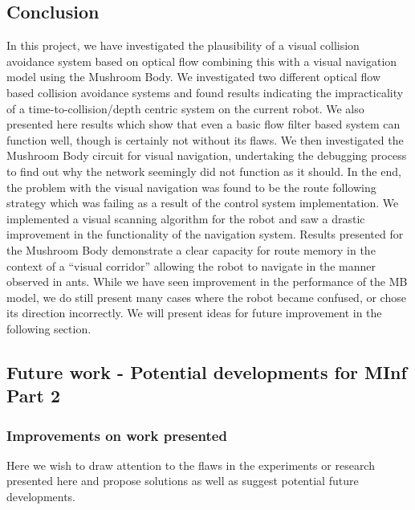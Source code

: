 \documentclass[a4paper,11pt,twoside,openright]{article}
\begin{document}
\subsection{Conclusion}
In this project, we have investigated the plausibility of a visual collision avoidance system based on optical flow combining
this with a visual navigation model using the Mushroom Body. We investigated two different optical flow based collision avoidance
systems and found results indicating the impracticality of a time-to-collision/depth centric system on the current robot. We
also presented here results which show that even a basic flow filter based system can function well, though is certainly
not without its flaws. We then investigated the Mushroom Body circuit for visual navigation, undertaking the debugging
process to find out why the network seemingly did not function as it should. In the end, the problem with the visual
navigation was found to be the route following strategy which was failing as a result of the control system implementation. We
implemented a visual scanning algorithm for the robot and saw a drastic improvement in the functionality of the navigation
system. Results presented for the Mushroom Body demonstrate a clear capacity for route memory in the context of a ``visual
corridor'' allowing the robot to navigate in the manner observed in ants. While we have seen improvement in the performance
of the MB model, we do still present many cases where the robot became confused, or chose its direction incorrectly. We will
present ideas for future improvement in the following section.

\subsection{Future work - Potential developments for MInf Part 2}
\subsubsection{Improvements on work presented}
Here we wish to draw attention to the flaws in the experiments or research presented here and propose solutions
as well as suggest potential future developments.
\newline
\end{document}
